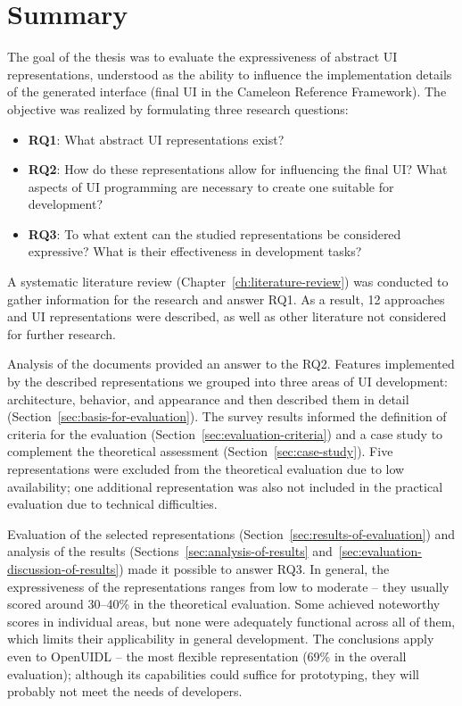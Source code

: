 \chapter{Summary}\label{ch:summary}

The goal of the thesis was to evaluate the expressiveness of abstract UI representations, understood as the ability to influence the implementation details of the generated interface (final UI in the Cameleon Reference Framework).
The objective was realized by formulating three research questions:
\begin{itemize}
    \item \textbf{RQ1}: What abstract UI representations exist?
    \item \textbf{RQ2}: How do these representations allow for influencing the final UI? What aspects of UI programming are necessary to create one suitable for development?
    \item \textbf{RQ3}: To what extent can the studied representations be considered expressive? What is their effectiveness in development tasks?
\end{itemize}

A systematic literature review (Chapter~\ref{ch:literature-review}) was conducted to gather information for the research and answer RQ1.
As a result, 12 approaches and UI representations were described, as well as other literature not considered for further research.

Analysis of the documents provided an answer to the RQ2.
Features implemented by the described representations we grouped into three areas of UI development: architecture, behavior, and appearance and then described them in detail (Section~\ref{sec:basis-for-evaluation}).
The survey results informed the definition of criteria for the evaluation (Section~\ref{sec:evaluation-criteria}) and a case study to complement the theoretical assessment (Section~\ref{sec:case-study}).
Five representations were excluded from the theoretical evaluation due to low availability; one additional representation was also not included in the practical evaluation due to technical difficulties.

Evaluation of the selected representations (Section~\ref{sec:results-of-evaluation}) and analysis of the results (Sections~\ref{sec:analysis-of-results} and~\ref{sec:evaluation-discussion-of-results}) made it possible to answer RQ3.
In general, the expressiveness of the representations ranges from low to moderate -- they usually scored around 30--40\% in the theoretical evaluation.
Some achieved noteworthy scores in individual areas, but none were adequately functional across all of them, which limits their applicability in general development.
The conclusions apply even to OpenUIDL -- the most flexible representation (69\% in the overall evaluation); although its capabilities could suffice for prototyping, they will probably not meet the needs of developers.

